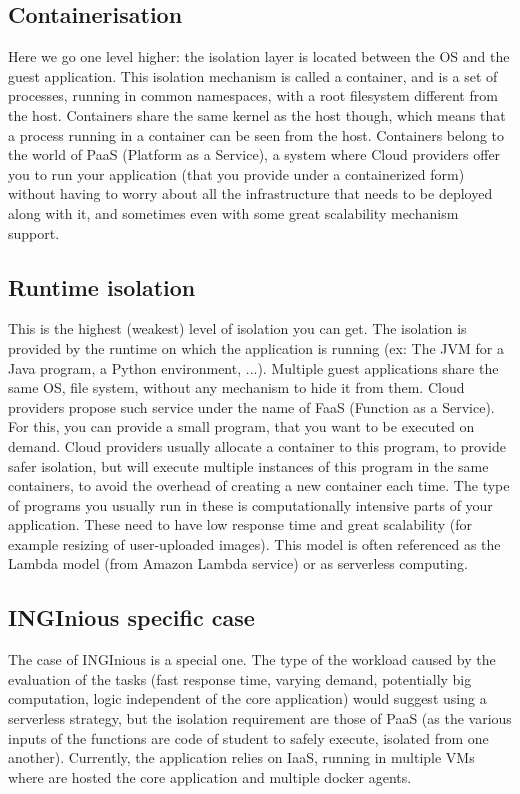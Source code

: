 \subsection{Containerisation}
Here we go one level higher: the isolation layer is located between the OS and the guest application.  This isolation mechanism is called a container, and is a set of processes, running in common namespaces, with a root filesystem different from the host.  Containers share the same kernel as the host though, which means that a process running in a container can be seen from the host.  Containers belong to the world of PaaS (Platform as a Service), a system where Cloud providers offer you to run your application (that you provide under a containerized form) without having to worry about all the infrastructure that needs to be deployed along with it, and sometimes even with some great scalability mechanism support.
\subsection{Runtime isolation}
This is the highest (weakest) level of isolation you can get.  The isolation is provided by the runtime on which the application is running (ex: The JVM for a Java program, a Python environment, ...).  Multiple guest applications share the same OS, file system, without any mechanism to hide it from them.  Cloud providers propose such service under the name of FaaS (Function as a Service).  For this, you can provide a small program, that you want to be executed on demand.  Cloud providers usually allocate a container to this program, to provide safer isolation, but will execute multiple instances of this program in the same containers, to avoid the overhead of creating a new container each time.  The type of programs you usually run in these is computationally intensive parts of your application. These need to have low response time and great scalability (for example resizing of user-uploaded images).  This model is often referenced as the Lambda model (from Amazon Lambda service) or as serverless computing.

\subsection{INGInious specific case}
The case of INGInious is a special one.  The type of the workload caused by the evaluation of the tasks (fast response time, varying demand, potentially big computation, logic independent of the core application) would suggest using a serverless strategy, but the isolation requirement are those of PaaS (as the various inputs of the functions are code of student to safely execute, isolated from one another).  Currently, the application relies on IaaS, running in multiple VMs where are hosted the core application and multiple docker agents.  

